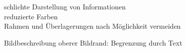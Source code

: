 \begin{frame}
\begin{frame}
\end{frame}
\clearpage


\begin{frame}
    
schlichte Darstellung von Informationen \\[\baselineskip]

reduzierte Farben \\[\baselineskip]

Rahmen und Überlagerungen nach Möglichkeit vermeiden \\[\baselineskip]

    
\end{frame}
\clearpage


\begin{frame}
    
Bildbeschreibung\newline
oberer Bildrand: Begrenzung durch Text\\[\baselineskip]


\end{frame}
\end{frame}
